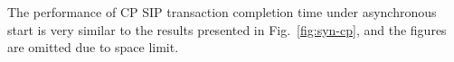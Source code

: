 The performance of CP SIP transaction completion time under asynchronous start is very similar to the results presented in Fig.~\ref{fig:syn-cp}, and the figures are omitted due to space limit.






